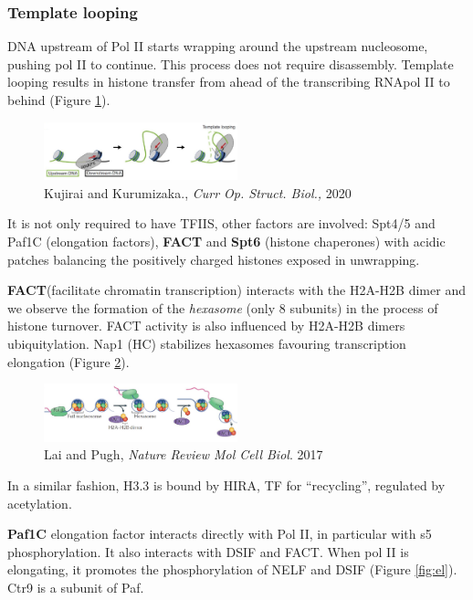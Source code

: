 \hypertarget{template-looping}{%
\subsubsection{Template looping}\label{template-looping}}

DNA upstream of Pol II starts wrapping around the upstream nucleosome, pushing pol II to continue. This process does not require disassembly.
Template looping results in histone transfer from ahead of the transcribing RNApol II to behind (Figure \ref{fig:looping}). 
\begin{figure}
\centering
\includegraphics[width=0.5\textwidth]{../_resources/Screenshot_2022-10-05_at_23-04-42.png}
\caption{Kujirai and Kurumizaka., \emph{Curr Op. Struct. Biol.,} 2020}
\label{fig:looping}
\end{figure}

It is not only required to have TFIIS, other factors are involved: Spt4/5 and Paf1C (elongation factors), \textbf{FACT} and \textbf{Spt6} (histone chaperones) with acidic patches balancing the positively charged histones exposed in unwrapping.

\textbf{FACT}(facilitate chromatin transcription) interacts with the H2A-H2B dimer and we observe the formation of the \emph{hexasome} (only 8 subunits) in the process of histone turnover. FACT activity is also influenced by H2A-H2B dimers ubiquitylation. Nap1 (HC) stabilizes hexasomes favouring transcription elongation (Figure \ref{fig:FACT}).

\begin{figure}
\centering
\includegraphics[width=0.5\textwidth]{../_resources/Screenshot_2022-10-05_at_23-05-01.png}
\caption{Lai and Pugh, \emph{Nature Review Mol Cell Biol}. 2017}
\label{fig:FACT}
\end{figure}

In a similar fashion, H3.3 is bound by HIRA, TF for ``recycling'', regulated by acetylation.

\textbf{Paf1C} elongation factor interacts directly with Pol II, in particular with s5 phosphorylation. It also interacts with DSIF and FACT. When pol II is elongating, it promotes the phosphorylation of NELF and DSIF (Figure \ref{fig:el}). Ctr9 is a subunit of Paf.

